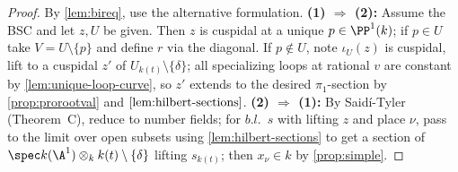 \begin{proof}
  By \cref{lem:bireq}, use the alternative formulation. \textbf{(1) \(\Rightarrow\) (2):}
  Assume the BSC and let \(z, U\) be given. Then \(z\) is cuspidal at a unique
  \(p \in \PP^1(k)\); if \(p \in U\) take \(V = U \setminus \{p\}\) and define \(r\)
  via the diagonal. If \(p \notin U\), note \(\iota_U(z)\) is cuspidal, lift to a
  cuspidal \(z'\) of \(U_{k(t)} \setminus \{\delta\}\); all specializing loops at
  rational \(v\) are constant by \cref{lem:unique-loop-curve}, so \(z'\) extends to
  the desired \(\pi_1\)-section by \cref{prop:prorootval} and \(\cref{lem:hilbert-sections}\).
  \textbf{(2) \(\Rightarrow\) (1):} By Saidí-Tyler (Theorem~C), reduce to number
  fields; for \(b.l.\)\ \(s\) with lifting \(z\) and place \(\nu\), pass to the limit
  over open subsets using \cref{lem:hilbert-sections} to get a section of
  \(\spec k(\A^1) \otimes_k k(t) \setminus \{\delta\}\) lifting \(s_{k(t)}\); then
  \(x_\nu \in k\) by \cref{prop:simple}.
\end{proof}

